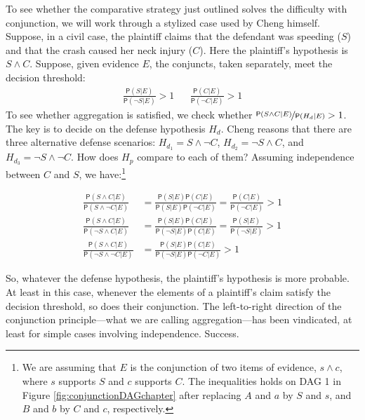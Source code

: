 \documentclass[
  10pt,
  dvipsnames,enabledeprecatedfontcommands]{scrartcl}
\newcommand{\n}{\neg}
\newcommand{\et}{\wedge}
\newcommand{\pr}[1]{\ensuremath{\mathsf{P}(#1)}}
\begin{document}
To see whether the comparative strategy just outlined solves the
difficulty with conjunction, we will work through a stylized case used
by Cheng himself. Suppose, in a civil case, the plaintiff claims that
the defendant was speeding (\(S\)) and that the crash caused her neck
injury (\(C\)). Here the plaintiff's hypothesis is \(S\et C\). Suppose,
given evidence \(E\), the conjuncts, taken separately, meet the decision
threshold: \begin{align}
 \nonumber 
 \frac{\pr{S\vert E}}{\pr{\neg S \vert E}} > 1   & & \frac{\pr{C\vert E}}{\pr{\neg C \vert E}} > 1
\end{align} \noindent To see whether aggregation is satisfied, we check
whether \(\nicefrac{\pr{S\et C\vert E}}{\pr{H_d \vert E}}>1\). The key
is to decide on the defense hypothesis \(H_d\). Cheng reasons that there
are three alternative defense scenarios: \(H_{d_1}= S\et \n C\),
\(H_{d_2}=\n S \et C\), and \(H_{d_3}=\n S \et \n C\). How does \(H_p\)
compare to each of them? Assuming independence between \(C\) and \(S\),
we have:\footnote{We are assuming that \(E\) is the conjunction of two
  items of evidence, \(s\et c\), where \(s\) supports \(S\) and \(c\)
  supports \(C\). The inequalities holds on \textsf{DAG 1} in Figure
  \ref{fig:conjunctionDAGchapter} after replacing \(A\) and \(a\) by
  \(S\) and \(s\), and \(B\) and \(b\) by \(C\) and \(c\), respectively.}

\begin{align}\label{eq:cheng-multiplication}
\frac{\pr{S\et C\vert E}}{\pr{S\et \n C\vert E}} & = \frac{\pr{S\vert E}\pr{C\vert E}}{\pr{S \vert E}\pr{\n C \vert E}}  =\frac{\pr{C\vert E}}{\pr{\n C \vert E}} > 1 \\
\nonumber
\frac{\pr{S\et C\vert E}}{\pr{\n S\et C\vert E}} & = \frac{\pr{S\vert E}\pr{C\vert E}}{\pr{\n S \vert E}\pr{C\vert E}}  = \frac{\pr{S\vert E}}{\pr{\n S \vert E}} > 1 \\
\nonumber
\frac{\pr{S\et C\vert E}}{\pr{\n S\et \n C\vert E}} & = \frac{\pr{S\vert E}\pr{C\vert E}}{\pr{\n S \vert E}\pr{\n C \vert E}}   > 1 
\end{align}

\noindent So, whatever the defense hypothesis, the plaintiff's
hypothesis is more probable. At least in this case, whenever the
elements of a plaintiff's claim satisfy the decision threshold, so does
their conjunction. The left-to-right direction of the conjunction
principle---what we are calling aggregation---has been vindicated, at
least for simple cases involving independence. Success.
\end{document}
